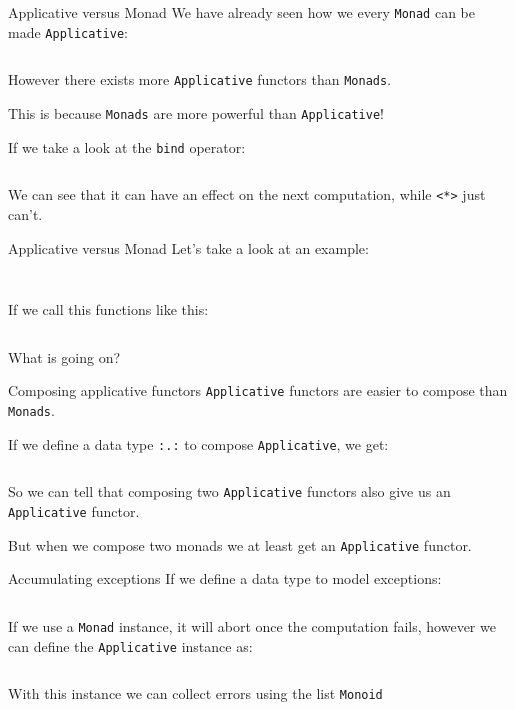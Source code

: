 \documentclass[10pt]{beamer}
\begin{document}
\begin{frame}{Applicative versus Monad}
  We have already seen how we every \verb~Monad~ can be made
  \verb~Applicative~:

  \inputminted{haskell}{../src/to_monad.hs}

  However there exists more \verb~Applicative~ functors than
  \verb~Monads~.

  This is because \verb~Monads~ are more powerful than
  \verb~Applicative~!

  If we take a look at the \verb~bind~ operator:

  \inputminted{haskell}{../src/bind.hs}

  We can see that it can have an effect on the next computation, while
  \verb~<*>~ just can't.

\end{frame}

\begin{frame}{Applicative versus Monad}
  Let's take a look at an example:

  \inputminted{haskell}{../src/miffy_monad.hs}

  \inputminted{haskell}{../src/iffy_ap.hs}

  If we call this functions like this:

  \inputminted{text}{../src/iffy.txt}

  What is going on?

\end{frame}

\begin{frame}{Composing applicative functors}
  \verb~Applicative~ functors are easier to compose than
  \verb~Monads~.

  If we define a data type \verb~:.:~ to compose \verb~Applicative~,
  we get:

  \inputminted{haskell}{"../src/composition.hs"}

  So we can tell that composing two \verb~Applicative~ functors also
  give us an \verb~Applicative~ functor.

  But when we compose two monads we at least get an \verb~Applicative~
  functor.

\end{frame}

\begin{frame}{Accumulating exceptions}
  If we define a data type to model exceptions:

  \inputminted{haskell}{../src/Except.hs}

  If we use a \verb~Monad~ instance, it will abort once the computation
  fails, however we can define the \verb~Applicative~ instance as:

  \inputminted{haskell}{../src/ExceptApplicative.hs}

  With this instance we can collect errors using the list
  \verb~Monoid~
\end{frame}
\end{document}
